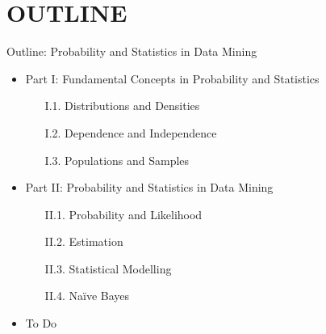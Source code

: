 \documentclass[handout]{beamer}
\begin{document}
\section*{OUTLINE}
\begin{frame}{Outline: Probability and Statistics in Data Mining}
\begin{itemize}
\item Part I: Fundamental Concepts in Probability and Statistics
	\begin{itemize}
	\item[I.1.] Distributions and Densities
	\item[I.2.] Dependence and Independence
	\item[I.3.] Populations and Samples
	\end{itemize}
\vspace*{0.3cm}
\item Part II: Probability and Statistics in Data Mining
	\begin{itemize}
	\item[II.1.] Probability and Likelihood
	\item[II.2.] Estimation
	\item[II.3.] Statistical Modelling
	\item[II.4.] Na\"{i}ve Bayes
	\end{itemize}
\vspace*{0.3cm}
\item To Do
\end{itemize}
\end{frame}



\end{document}
